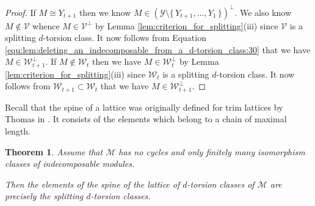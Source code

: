 \documentclass[12pt,reqno]{amsart}
\def\cM{\mathscr{M}}
\def\cV{\mathscr{V}}
\def\cW{\mathscr{W}}
\def\cY{\mathscr{Y}}
\numberwithin{equation}{section}
\newtheorem{Theorem}[Lemma]{Theorem}
\theoremstyle{definition}
\theoremstyle{theorem}
\theoremstyle{definition}
\begin{document}
\begin{proof}
If $M \cong Y_{ t+1 }$ then we know $M \in ( \cY \setminus \{\, Y_{ t+1 }, \ldots, Y_1 \,\} )^{ \perp }$.  We also know $M \not\in \cV$ whence $M \in \cV^{ \perp }$ by Lemma \ref{lem:criterion_for_splitting}(iii) since $\cV$ is a splitting $d$-torsion class.  It now follows from Equation \eqref{equ:lem:deleting_an_indecomposable_from_a_d-torsion_class:30} that we have $M \in \cW_{ t+1 }^{ \perp }$.  If $M \not\in \cW_t$ then we have $M \in \cW_t^{ \perp }$ by Lemma \ref{lem:criterion_for_splitting}(iii) since $\cW_t$ is a splitting $d$-torsion class.  It now follows from $\cW_{ t+1 } \subset \cW_t$ that we have $M \in \cW_{ t+1 }^{ \perp }$.
\end{proof}


Recall that the spine of a lattice was originally defined for trim lattices by Thomas in \cite[p.\ 257]{Thomas_An-analogue-of-distributivity-for-ungraded-lattices}.  It consists of the elements which belong to a chain of maximal length.  


\begin{Theorem}
\label{thm:spine}
Assume that $\cM$ has no cycles and only finitely many isomorphism classes of indecomposable modules.  

Then the elements of the spine of the lattice of $d$-torsion classes of $\cM$ are precisely the splitting $d$-torsion classes.
\end{Theorem}
\end{document}
